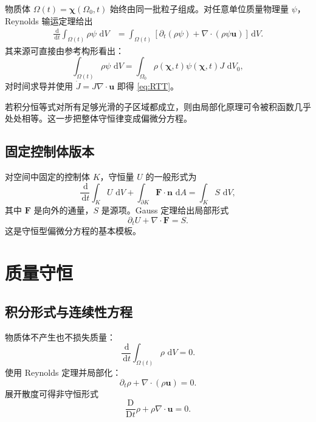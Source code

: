 \documentclass[cn,hazy,blue,11pt,normal]{elegantnote}
\numberwithin{equation}{section}
\newcommand{\dd}{\,\mathrm d}
\newcommand{\Dt}{\frac{\mathrm D}{\mathrm Dt}}
\newcommand{\vct}[1]{\bm{#1}}
\begin{document}
物质体 $\Omega(t)=\vct{\chi}(\Omega_0,t)$ 始终由同一批粒子组成。对任意单位质量物理量 $\psi$，Reynolds 输运定理给出
\begin{align}
 \frac{\dd}{\dd t}\int_{\Omega(t)}\rho\psi\,\dd V
 &=\int_{\Omega(t)}\left[\partial_t(\rho\psi)
   +\nabla\cdot(\rho\psi\vct{u})\right]\dd V. \label{eq:RTT}
\end{align}
其来源可直接由参考构形看出：
\begin{equation}
 \int_{\Omega(t)}\rho\psi\,\dd V
 =\int_{\Omega_0}\rho(\vct{\chi},t)\psi(\vct{\chi},t)J\,\dd V_0,
\end{equation}
对时间求导并使用 $\dot J=J\nabla\cdot\vct{u}$ 即得 \eqref{eq:RTT}。

若积分恒等式对所有足够光滑的子区域都成立，则由局部化原理可令被积函数几乎处处相等。这一步把整体守恒律变成偏微分方程。

\subsection{固定控制体版本}

对空间中固定的控制体 $K$，守恒量 $U$ 的一般形式为
\begin{equation}
 \frac{\dd}{\dd t}\int_K U\,\dd V
 +\int_{\partial K}\vct{F}\cdot\vct{n}\,\dd A
 =\int_K S\,\dd V,
\end{equation}
其中 $\vct{F}$ 是向外的通量，$S$ 是源项。Gauss 定理给出局部形式
\begin{equation}
 \boxed{\partial_t U+\nabla\cdot\vct{F}=S.}
\end{equation}
这是守恒型偏微分方程的基本模板。

\section{质量守恒}

\subsection{积分形式与连续性方程}

物质体不产生也不损失质量：
\begin{equation}
 \frac{\dd}{\dd t}\int_{\Omega(t)}\rho\,\dd V=0.
\end{equation}
使用 Reynolds 定理并局部化：
\begin{equation}
 \boxed{\partial_t\rho+\nabla\cdot(\rho\vct{u})=0.} \label{eq:mass-cons}
\end{equation}
展开散度可得非守恒形式
\begin{equation}
 \boxed{\Dt\rho+\rho\nabla\cdot\vct{u}=0.} \label{eq:mass-material}
\end{equation}
\end{document}
